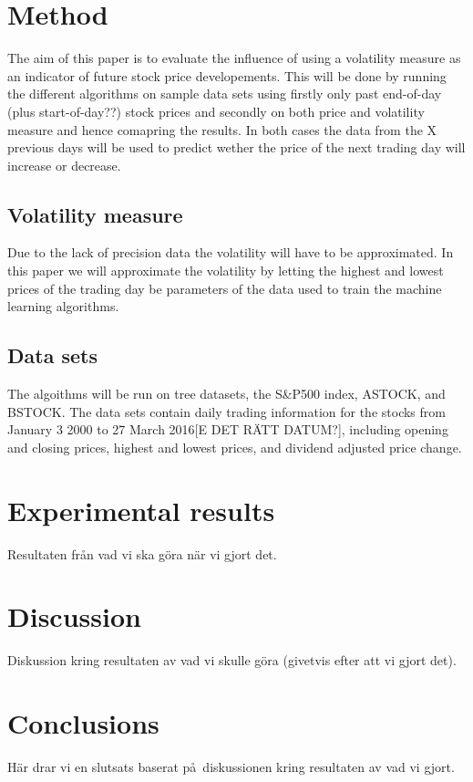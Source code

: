 \documentclass{article}
\begin{document}
\newpage

\section{Method}
The aim of this paper is to evaluate the influence of using a volatility measure as an indicator of future stock price developements. This will be done by running the different algorithms on sample data sets using firstly only past end-of-day (plus start-of-day??) stock prices and secondly on both price and volatility measure and hence comapring the results. In both cases the data from the X previous days will be used to predict wether the price of the next trading day will increase or decrease.

\subsection{Volatility measure}
Due to the lack of precision data the volatility will have to be approximated. In this paper we will approximate the volatility by letting the highest and lowest prices of the trading day be parameters of the data used to train the machine learning algorithms.

\subsection{Data sets}
The algoithms will be run on tree datasets, the S\&P500 index, ASTOCK, and BSTOCK. The data sets contain daily trading information for the stocks from January 3 2000 to 27 March 2016[E DET R\"ATT DATUM?], including opening and closing prices, highest and lowest prices, and dividend adjusted price change. 

\newpage

\section{Experimental results}
Resultaten fr\aa n vad vi ska g\"ora n\"ar vi gjort det.
\section{Discussion}
Diskussion kring resultaten av vad vi skulle g\"ora (givetvis efter att vi gjort det).
\section{Conclusions}
H\"ar drar vi en slutsats baserat p\aa\ diskussionen kring resultaten av vad vi gjort.
\end{document}
